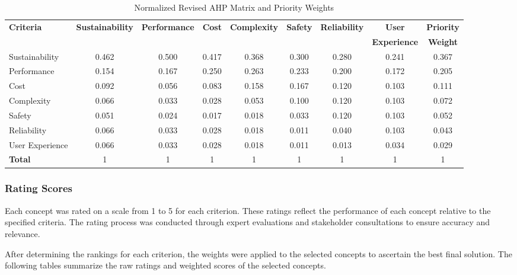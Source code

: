 \documentclass[12pt]{article}
\begin{document}
\begin{landscape}
\begin{table}[h!]
\centering
\caption{Normalized Revised AHP Matrix and Priority Weights}
\label{tab:normalized_revised_ahp}
\begin{tabular}{l c c c c c c c c}
\toprule
\textbf{Criteria} & \textbf{Sustainability} & \textbf{Performance} & \textbf{Cost} & \textbf{Complexity} & \textbf{Safety} & \textbf{Reliability} & \textbf{User} & \textbf{Priority} \\
 &  &  &  &  &  &  & \textbf{Experience} & \textbf{Weight} \\
\midrule
Sustainability & 0.462 & 0.500 & 0.417 & 0.368 & 0.300 & 0.280 & 0.241 & 0.367 \\
Performance & 0.154 & 0.167 & 0.250 & 0.263 & 0.233 & 0.200 & 0.172 & 0.205 \\
Cost & 0.092 & 0.056 & 0.083 & 0.158 & 0.167 & 0.120 & 0.103 & 0.111 \\
Complexity & 0.066 & 0.033 & 0.028 & 0.053 & 0.100 & 0.120 & 0.103 & 0.072 \\
Safety & 0.051 & 0.024 & 0.017 & 0.018 & 0.033 & 0.120 & 0.103 & 0.052 \\
Reliability & 0.066 & 0.033 & 0.028 & 0.018 & 0.011 & 0.040 & 0.103 & 0.043 \\
User Experience & 0.066 & 0.033 & 0.028 & 0.018 & 0.011 & 0.013 & 0.034 & 0.029 \\
\midrule
\textbf{Total} & 1 & 1 & 1 & 1 & 1 & 1 & 1 & 1 \\
\bottomrule
\end{tabular}
\end{table}
\end{landscape}

\subsubsection{Rating Scores}

Each concept was rated on a scale from 1 to 5 for each criterion. These ratings reflect the performance of each concept relative to the specified criteria. The rating process was conducted through expert evaluations and stakeholder consultations to ensure accuracy and relevance.

After determining the rankings for each criterion, the weights were applied to the selected concepts to ascertain the best final solution. The following tables summarize the raw ratings and weighted scores of the selected concepts.
\end{document}
